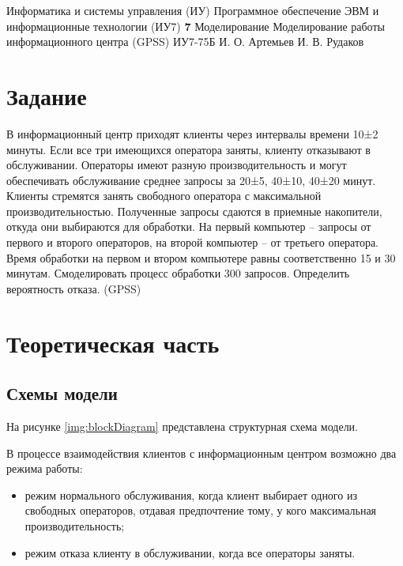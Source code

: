 \documentclass{bmstu}
\begin{document}
\makereporttitle
{Информатика и системы управления (ИУ)}
{Программное обеспечение ЭВМ и информационные технологии (ИУ7)}
{\textbf{7}}
{Моделирование}
{Моделирование работы информационного центра (GPSS)}
{}
{ИУ7-75Б}
{И. О. Артемьев}
{И. В. Рудаков}


\setcounter{page}{2}
\renewcommand{\contentsname}{СОДЕРЖАНИЕ} 
\tableofcontents

\chapter{Задание}

В информационный центр приходят клиенты через интервалы времени 10±2 минуты. Если все три имеющихся оператора заняты, клиенту отказывают в обслуживании. Операторы имеют разную производительность и могут обеспечивать обслуживание среднее запросы за 20±5, 40±10, 40±20 минут. Клиенты стремятся занять свободного оператора с максимальной производительностью. Полученные запросы сдаются в приемные накопители, откуда они выбираются для обработки. На первый компьютер -- запросы от первого и второго операторов, на второй компьютер -- от третьего оператора. Время обработки на первом и втором компьютере равны соответственно 15 и 30 минутам. Смоделировать процесс обработки 300 запросов. Определить вероятность отказа. (GPSS)

\chapter{Теоретическая часть}

\section{Схемы модели}

На рисунке \ref{img:blockDiagram} представлена структурная схема модели.


В процессе взаимодействия клиентов с информационным центром возможно два режима работы:

\begin{itemize}
    \item режим нормального обслуживания, когда клиент выбирает одного из свободных операторов, отдавая предпочтение тому, у кого максимальная производительность;
    \item режим отказа клиенту в обслуживании, когда все операторы заняты.
\end{itemize}
\end{document}
